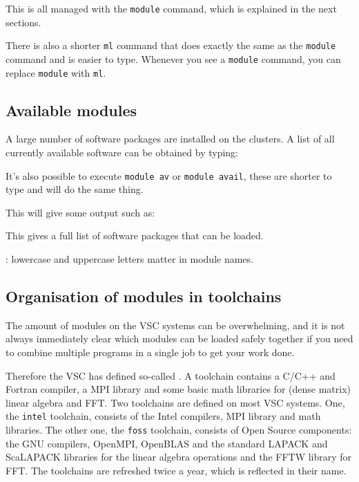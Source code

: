 This is all managed with the \lstinline|module| command, which is explained in the next sections.

\ifusinglmod
There is also a shorter \lstinline|ml| command that does exactly the same as the \lstinline|module|
command and is easier to type. Whenever you see a \lstinline|module| command, you can replace
\lstinline|module| with \lstinline|ml|.
\fi


\subsection{Available modules}

A large number of software packages are installed on the \hpc clusters. A
list of all currently available software can be obtained by typing:

\begin{prompt}
\end{prompt}

It's also possible to execute \lstinline|module av| or \lstinline|module avail|,
these are shorter to type and will do the same thing.

This will give some output such as:


This gives a full list of software packages that can be loaded.

: lowercase and uppercase letters
matter in module names.

\subsection{Organisation of modules in toolchains}

The amount of modules on the VSC systems can be overwhelming, and it is not
always immediately clear which modules can be loaded safely together if you
need to combine multiple programs in a single job to get your work done.

Therefore the VSC has defined so-called .
A toolchain contains a C/C++ and Fortran compiler, a MPI library and some basic
math libraries for (dense matrix) linear algebra and FFT. Two toolchains are
defined on most VSC systems. One, the \lstinline|intel| toolchain, consists of the Intel
compilers, MPI library and math libraries. The other one, the \lstinline|foss| toolchain,
consists of Open Source components: the GNU compilers, OpenMPI, OpenBLAS and
the standard LAPACK and ScaLAPACK libraries for the linear algebra operations
and the FFTW library for FFT. The toolchains are refreshed twice a year,
which is reflected in their name.


